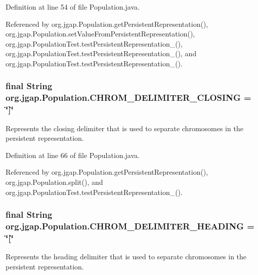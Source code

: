 Definition at line 54 of file Population.\-java.



Referenced by org.\-jgap.\-Population.\-get\-Persistent\-Representation(), org.\-jgap.\-Population.\-set\-Value\-From\-Persistent\-Representation(), org.\-jgap.\-Population\-Test.\-test\-Persistent\-Representation\-\_(), org.\-jgap.\-Population\-Test.\-test\-Persistent\-Representation\-\_(), and org.\-jgap.\-Population\-Test.\-test\-Persistent\-Representation\-\_().

\hypertarget{classorg_1_1jgap_1_1_population_a35f548ce2820e079590565c66bae85aa}{
\subsubsection[{C\-H\-R\-O\-M\-\_\-\-D\-E\-L\-I\-M\-I\-T\-E\-R\-\_\-\-C\-L\-O\-S\-I\-N\-G}]{\setlength{\rightskip}{0pt plus 5cm}final String org.\-jgap.\-Population.\-C\-H\-R\-O\-M\-\_\-\-D\-E\-L\-I\-M\-I\-T\-E\-R\-\_\-\-C\-L\-O\-S\-I\-N\-G = \char`\"{}\mbox{]}\char`\"{}\hspace{0.3cm}{\ttfamily [static]}}}\label{classorg_1_1jgap_1_1_population_a35f548ce2820e079590565c66bae85aa}
Represents the closing delimiter that is used to separate chromosomes in the persistent representation. 

Definition at line 66 of file Population.\-java.



Referenced by org.\-jgap.\-Population.\-get\-Persistent\-Representation(), org.\-jgap.\-Population.\-split(), and org.\-jgap.\-Population\-Test.\-test\-Persistent\-Representation\-\_().

\hypertarget{classorg_1_1jgap_1_1_population_af6282eaa6a1d7a0218d85db1b36960a4}{
\subsubsection[{C\-H\-R\-O\-M\-\_\-\-D\-E\-L\-I\-M\-I\-T\-E\-R\-\_\-\-H\-E\-A\-D\-I\-N\-G}]{\setlength{\rightskip}{0pt plus 5cm}final String org.\-jgap.\-Population.\-C\-H\-R\-O\-M\-\_\-\-D\-E\-L\-I\-M\-I\-T\-E\-R\-\_\-\-H\-E\-A\-D\-I\-N\-G = \char`\"{}\mbox{[}\char`\"{}\hspace{0.3cm}{\ttfamily [static]}}}\label{classorg_1_1jgap_1_1_population_af6282eaa6a1d7a0218d85db1b36960a4}
Represents the heading delimiter that is used to separate chromosomes in the persistent representation. 


